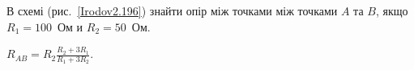 %

\begin{problem}\label{prb:Irodov2.196}
В схемі (рис.~\ref{Irodov2.196}) знайти опір між
точками між точками $A$ та $B$, якщо $R_1 = 100$~Ом и $R_2 = 50$~Ом.
\begin{solution}
	$R_{AB}  = R_2 \frac{R_2 + 3R_1}{R_1 + 3R_2}$.
\end{solution}
\end{problem}

